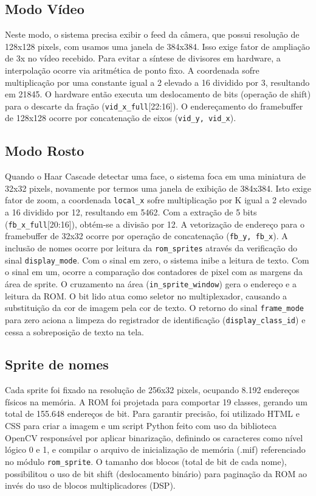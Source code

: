 \subsection{Modo Vídeo}
Neste modo, o sistema precisa exibir o feed da câmera, que possui resolução de 128x128 pixels, com usamos uma janela de 384x384. Isso exige fator de ampliação de 3x no vídeo recebido. Para evitar a síntese de divisores em hardware, a interpolação ocorre via aritmética de ponto fixo. A coordenada sofre multiplicação por uma constante igual a 2 elevado a 16 dividido por 3, resultando em 21845. O hardware então executa um deslocamento de bits (operação de shift) para o descarte da fração (\texttt{vid\_x\_full}[22:16]). O endereçamento do framebuffer de 128x128 ocorre por concatenação de eixos (\texttt{vid\_y, vid\_x}).

\subsection{Modo Rosto}
Quando o Haar Cascade detectar uma face, o sistema foca em uma miniatura de 32x32 pixels, novamente por termos uma janela de exibição de 384x384. Isto exige fator de zoom, a coordenada \texttt{local\_x} sofre multiplicação por K igual a 2 elevado a 16 dividido por 12, resultando em 5462. Com a extração de 5 bits (\texttt{fb\_x\_full}[20:16]), obtém-se a divisão por 12. A vetorização de endereço para o framebuffer de 32x32 ocorre por operação de concatenação (\texttt{fb\_y, fb\_x}). A inclusão de nomes ocorre por leitura da \texttt{rom\_sprites} através da verificação do sinal \texttt{display\_mode}. Com o sinal em zero, o sistema inibe a leitura de texto. Com o sinal em um, ocorre a comparação dos contadores de pixel com as margens da área de sprite. O cruzamento na área (\texttt{in\_sprite\_window}) gera o endereço e a leitura da ROM. O bit lido atua como seletor no multiplexador, causando a substituição da cor de imagem pela cor de texto. O retorno do sinal \texttt{frame\_mode} para zero aciona a limpeza do registrador de identificação (\texttt{display\_class\_id}) e cessa a sobreposição de texto na tela.

\subsection{Sprite de nomes}
Cada sprite foi fixado na resolução de 256x32 pixels, ocupando 8.192 endereços físicos na memória. A ROM foi projetada para comportar 19 classes, gerando um total de 155.648 endereços de bit. Para garantir precisão, foi utilizado HTML e CSS para criar a imagem e um script Python feito com uso da biblioteca OpenCV responsável por aplicar binarização, definindo os caracteres como nível lógico 0 e 1, e compilar o arquivo de inicialização de memória (.mif) referenciado no módulo \texttt{rom\_sprite}. 
O tamanho dos blocos (total de bit de cada nome), possibilitou o uso de bit shift (deslocamento binário) para paginação da ROM ao invés do uso de blocos multiplicadores (DSP). 

